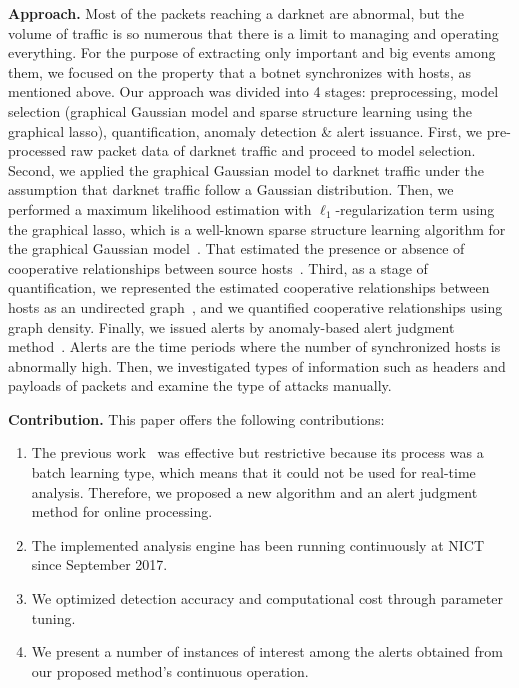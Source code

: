 \documentclass[letterpaper]{sig-alternate-10pt}
\begin{document}
\vspace*{0.3 cm}
\noindent
\textbf{Approach.}\space\space
Most of the packets reaching a darknet are abnormal, but the volume of traffic is so numerous that there is a limit to managing and operating everything.
For the purpose of extracting only important and big events among them, we focused on the property that a botnet synchronizes with hosts, as mentioned above.
Our approach was divided into 4 stages: preprocessing, model selection (graphical Gaussian model and sparse structure learning using the graphical lasso), quantification, anomaly detection \& alert issuance.
First, we pre-processed raw packet data of darknet traffic and proceed to model selection.
Second, we applied the graphical Gaussian model to darknet traffic under the assumption that darknet traffic follow a Gaussian distribution.
Then, we performed a maximum likelihood estimation with $\ell_1$-regularization term using the graphical lasso, which is a well-known sparse structure learning algorithm for the graphical Gaussian model~\cite{Friedman}.
That estimated the presence or absence of cooperative relationships between source hosts~\cite{Hamasaki}.
Third, as a stage of quantification, we represented the estimated cooperative relationships between hosts as an undirected graph~\cite{Mukai2}, and we quantified cooperative relationships using graph density.
Finally, we issued alerts by anomaly-based alert judgment method~\cite{Han}.
Alerts are the time periods where the number of synchronized hosts is abnormally high.
Then, we investigated types of information such as headers and payloads of packets and examine the type of attacks manually.


\vspace*{0.3 cm}
\noindent
\textbf{Contribution.}\space\space
This paper offers the following contributions:
\begin{enumerate}
	\item The previous work~\cite{Han} was effective but restrictive because its process was a batch learning type, which means that it could not be used for real-time analysis.
Therefore, we proposed a new algorithm and an alert judgment method for online processing.

	\item The implemented analysis engine has been running continuously at NICT since September 2017.

	\item We optimized detection accuracy and computational cost through parameter tuning.

	\item We present a number of instances of interest among the alerts obtained from our proposed method's continuous operation.
\end{enumerate}
\end{document}
